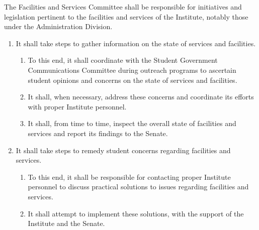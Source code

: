 \item The Facilities and Services Committee shall be responsible for initiatives and legislation pertinent to the facilities and services
of the Institute, notably those under the Administration Division.
\begin{enumerate}
\item It shall take steps to gather information on the state of services and facilities.
\begin{enumerate}
\item To this end, it shall coordinate with the Student Government Communications Committee during outreach programs to
ascertain student opinions and concerns on the state of services and facilities.
\item It shall, when necessary, address these concerns and coordinate its efforts with proper Institute personnel.
\item It shall, from time to time, inspect the overall state of facilities and services and report its findings to the Senate.
\end{enumerate}

\item It shall take steps to remedy student concerns regarding facilities and services.
\begin{enumerate}
\item To this end, it shall be responsible for contacting proper Institute personnel to discuss practical solutions to issues
regarding facilities and services.
\item It shall attempt to implement these solutions, with the support of the Institute and the Senate.
\end{enumerate}
\end{enumerate}